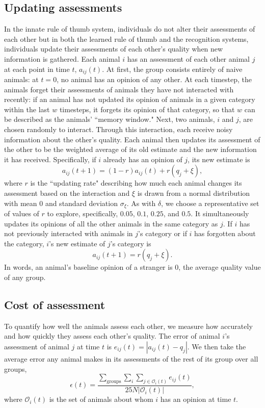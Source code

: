 \subsection*{Updating assessments}
In the innate rule of thumb system, individuals do not alter their assessments of each other but in both the learned rule of thumb and the recognition systems, individuals update their assessments of each other's quality when new information is gathered. Each animal $i$ has an assessment of each other animal $j$ at each point in time $t$, $a_{ij}(t)$. At first, the group consists entirely of naive animals: at $t=0$, no animal has an opinion of any other. At each timestep, the animals forget their assessments of animals they have not interacted with recently: if an animal has not updated its opinion of animals in a given category within the last $w$ timesteps, it forgets its opinion of that category, so that $w$ can be described as the animals' ``memory window." Next, two animals, $i$ and $j$, are chosen randomly to interact. Through this interaction, each receive noisy information about the other's quality. Each animal then updates its assessment of the other to be the weighted average of its old estimate and the new information it has received. Specifically, if $i$ already has an opinion of $j$, its new estimate is
\begin{equation*}
a_{ij}(t+1)=(1-r)a_{ij}(t)+r(q_j+\xi),
\end{equation*}
where $r$ is the ``updating rate" describing how much each animal changes its assessment based on the interaction and $\xi$ is drawn from a normal distribution with mean $0$ and standard deviation $\sigma_\xi$. As with $\delta$, we choose a representative set of values of $r$ to explore, specifically, $0.05$, $0.1$, $0.25$, and $0.5$. It simultaneously updates its opinions of all the other animals in the same category as $j$.
If $i$ has not previously interacted with animals in $j$'s category or if $i$ has forgotten about the category, $i$'s new estimate of $j$'s category is
\begin{equation*}
a_{ij}(t+1)=r(q_j+\xi).
\end{equation*}
In words, an animal's baseline opinion of a stranger is $0$, the average quality value of any group. 
 
\subsection{Cost of assessment }
To quantify how well the animals assess each other, we measure how accurately and how quickly they assess each other's quality. The error of animal $i$'s assessment of animal $j$ at time $t$ is $e_{ij}(t)=|a_{ij}(t)-q_j|$. We then take the average error any animal makes in its assessments of the rest of its group over all groups, 
\begin{equation*}
\epsilon(t) = \frac{\sum_{\text{groups}}\sum_i\sum_{j\in \mathscr{O}_i(t)}e_{ij}(t)}{25N|\mathscr{O}_i(t)|},
\end{equation*}
where $\mathscr{O}_i(t)$ is the set of animals about whom $i$ has an opinion at time $t$.

